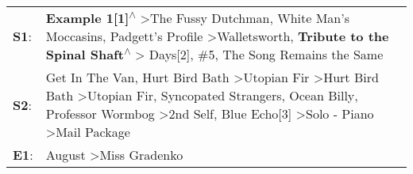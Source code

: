 \begin{supertabular}{p{0.03\textwidth}p{0.92\textwidth}}
 \textbf{S1}:  &                                                                                                      \textbf{Example 1[1]\textsuperscript{$\wedge$}} \textgreater \enspace The Fussy Dutchman\textsuperscript{}, \enspace White Man's Moccasins\textsuperscript{}, \enspace Padgett's Profile\textsuperscript{} \textgreater \enspace Walletsworth\textsuperscript{}, \enspace \textbf{Tribute to the Spinal Shaft\textsuperscript{$\wedge$}} \textgreater {} Days[2]\textsuperscript{}, \enspace \#5\textsuperscript{}, \enspace The Song Remains the Same\textsuperscript{}  \enspace  \\
 \textbf{S2}:  &  Get In The Van\textsuperscript{}, \enspace Hurt Bird Bath\textsuperscript{} \textgreater \enspace Utopian Fir\textsuperscript{} \textgreater \enspace Hurt Bird Bath\textsuperscript{} \textgreater \enspace Utopian Fir\textsuperscript{}, \enspace Syncopated Strangers\textsuperscript{}, \enspace Ocean Billy\textsuperscript{}, \enspace Professor Wormbog\textsuperscript{} \textgreater \enspace 2nd Self\textsuperscript{}, \enspace Blue Echo[3]\textsuperscript{} \textgreater \enspace Solo - Piano\textsuperscript{} \textgreater \enspace Mail Package\textsuperscript{}  \enspace  \\
 \textbf{E1}:  &                                                                                                                                                                                                                                                                                                                                                                                                                                                                                                         August\textsuperscript{} \textgreater \enspace Miss Gradenko\textsuperscript{}  \enspace  \\
\end{supertabular}
